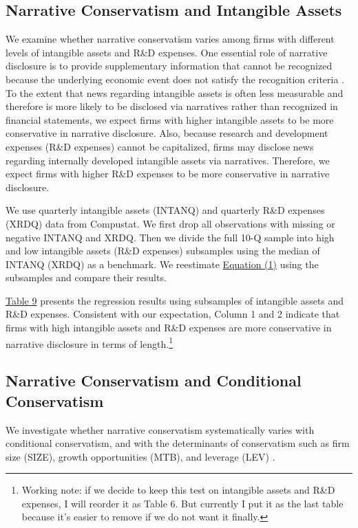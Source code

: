 \documentclass[letterpaper,11pt]{article}
\begin{document}
\begin{spacing}{1.5}
\subsection{Narrative Conservatism and Intangible Assets}
\noindent We examine whether narrative conservatism varies among firms with different levels of intangible assets and R\&D expenses. One essential role of narrative disclosure is to provide supplementary information that cannot be recognized because the underlying economic event does not satisfy the recognition criteria \cite{fasbStatementFinancialAccounting1984}. To the extent that news regarding intangible assets is often less measurable and therefore is more likely to be disclosed via narratives rather than recognized in financial statements, we expect firms with higher intangible assets to be more conservative in narrative disclosure. Also, because research and development expenses (R\&D expenses) cannot be capitalized, firms may disclose news regarding internally developed intangible assets via narratives. Therefore,  we expect firms with higher R\&D expenses to be more conservative in narrative disclosure.

We use quarterly intangible assets (INTANQ) and quarterly R\&D expenses (XRDQ) data from Compustat. We first drop all observations with missing or negative INTANQ and XRDQ. Then we divide the full 10-Q sample into high and low intangible assets (R\&D expenses) subsamples using the median of INTANQ (XRDQ) as a benchmark. We reestimate \hyperref[eq1]{Equation (1)} using the subsamples and compare their results.

\hyperref[T9]{Table 9} presents the regression results using subsamples of intangible assets and R\&D expenses. Consistent with our expectation, Column 1 and 2 indicate that firms with high intangible assets and R\&D expenses are more conservative in narrative disclosure in terms of length.\footnote{Working note: if we decide to keep this test on intangible assets and R\&D expenses, I will reorder it as Table 6. But currently I put it as the last table because it's easier to remove if we do not want it finally.}

\subsection{Narrative Conservatism and Conditional Conservatism}
\noindent We investigate whether narrative conservatism systematically varies with conditional conservatism, and with the determinants of conservatism such as firm size (SIZE), growth opportunities (MTB), and leverage (LEV) \cite{wattsConservatismAccountingPart2003, qiangEffectsContractingLitigation2007, khanEstimationEmpiricalProperties2009, laraEconomicDeterminantsConditional2009}.  


\end{spacing}
\end{document}
